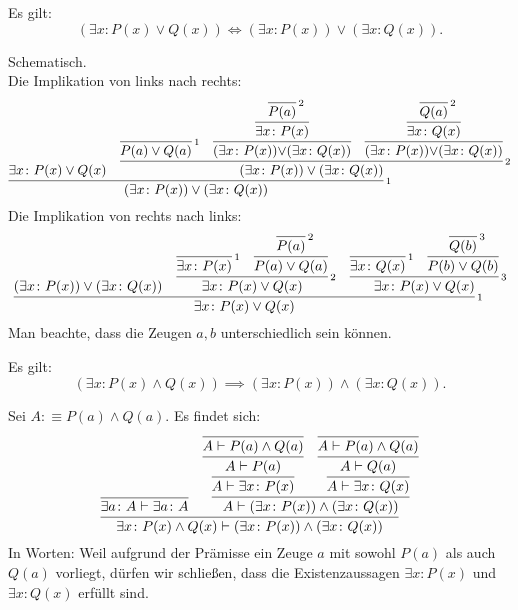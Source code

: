 \begin{Satz}\label{exists-dl}
Es gilt:
\[(\exists x\colon P(x)\lor Q(x)) \iff
(\exists x\colon P(x))\lor(\exists x\colon Q(x)).\]
\end{Satz}
\begin{Beweis} Schematisch.\\
Die Implikation von links nach rechts:
\[
\infer[\infernote{1}]{(\exists x\colon P(x))\lor (\exists x\colon Q(x))}{
  \exists x\colon P(x)\lor Q(x)
& \infer[\infernote{2}]{(\exists x\colon P(x))\lor (\exists x\colon Q(x))}{
    \infer[\infernote{1}]{P(a)\lor Q(a)}{}
  & \infer{(\exists x\colon P(x)){\lor}(\exists x\colon Q(x))}{\infer{
      \exists x\colon P(x)}{\infer[\infernote{2}]{P(a)}{}}}
  & \infer{(\exists x\colon P(x)){\lor}(\exists x\colon Q(x))}{\infer{
      \exists x\colon Q(x)}{\infer[\infernote{2}]{Q(a)}{}}}}}
\]
Die Implikation von rechts nach links:
\[\infer[\infernote{1}]{\exists x\colon P(x)\lor Q(x)}{
  (\exists x\colon P(x))\lor(\exists x\colon Q(x))
  & \infer[\infernote{2}]{\exists x\colon P(x)\lor Q(x)}{
      \infer[\infernote{1}]{\exists x\colon P(x)}{}
      &
      \infer{P(a)\lor Q(a)}{
        \infer[\infernote{2}]{P(a)}{}}}
  & \infer[\infernote{3}]{\exists x\colon P(x)\lor Q(x)}{
      \infer[\infernote{1}]{\exists x\colon Q(x)}{}
      &
      \infer{P(b)\lor Q(b)}{
        \infer[\infernote{3}]{Q(b)}{}}}
}\]
Man beachte, dass die Zeugen $a,b$ unterschiedlich sein können.\,\qedsymbol
\end{Beweis}

\begin{Satz}\label{exists-asym-dl}
Es gilt:
\[(\exists x\colon P(x)\land Q(x)) \implies (\exists x\colon P(x))\land (\exists x\colon Q(x)).\]
\end{Satz}
\begin{Beweis}[Beweis] Sei $A:\equiv P(a)\land Q(a)$. Es findet sich:
\[
\infer{\exists x\colon P(x)\land Q(x)\vdash (\exists x\colon P(x))\land (\exists x\colon Q(x))}{
  \infer{\exists a\colon A\vdash\exists a\colon A}{}
& \infer{A\vdash (\exists x\colon P(x))\land (\exists x\colon Q(x))}{
    \infer{A\vdash\exists x\colon P(x)}{
      \infer{A\vdash P(a)}{\infer{A\vdash P(a)\land Q(a)}{}}}
  & \infer{A\vdash\exists x\colon Q(x)}{
       \infer{A\vdash Q(a)}{\infer{A\vdash P(a)\land Q(a)}{}}}}}
\]
In Worten: Weil aufgrund der Prämisse ein Zeuge $a$ mit sowohl $P(a)$
als auch $Q(a)$ vorliegt, dürfen wir schließen, dass die
Existenzaussagen $\exists x\colon P(x)$ und $\exists x\colon Q(x)$
erfüllt sind.\,\qedsymbol
\end{Beweis}


